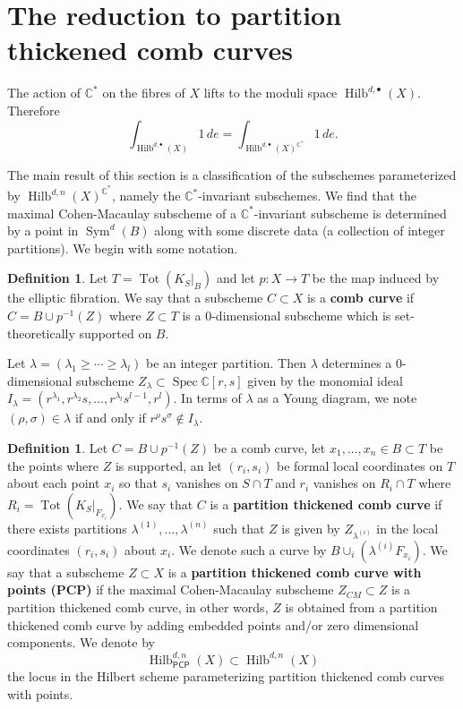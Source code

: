 \documentclass{amsart}
\theoremstyle{definition}
\newtheorem{definition}[theorem]{Definition}
\newcommand{\CC} {\mathbb{C}}          %
\newcommand{\Sym}{\operatorname{Sym}}
\newcommand{\Hilb}{\operatorname{Hilb}}
\newcommand{\Tot}{\operatorname{Tot}}
\newcommand{\Spec}{\operatorname{Spec}}
\newcommand{\PCP}{\mathsf{PCP}}
\begin{document}
\section{The reduction to partition thickened comb curves}\label{sect:
reduction to thickened comb curves}

The action of $\CC^*$ on the fibres of $X$ lifts to the moduli space
$\Hilb^{d,\bullet}(X)$. Therefore
$$
\int_{\Hilb^{d,\bullet}(X)} 1 \, de = \int_{\Hilb^{d,\bullet}(X)^{\CC^*}} 1 \, de.
$$

The main result of this section is a classification of the subschemes
parameterized by $\Hilb^{d,n}(X)^{\CC^{*}}$, namely the
$\CC^{*}$-invariant subschemes.  We find that the maximal
Cohen-Macaulay subscheme of a $\CC^{*}$-invariant subscheme is
determined by a point in $\Sym^{d}(B)$ along with some discrete data
(a collection of integer partitions). We begin with some notation.




\begin{definition}\label{defn: comb curves} 
Let $T=\Tot(K_{S}|_{B})$ and let $p:X\to T$ be the map induced by the
elliptic fibration. We say that a subscheme $C\subset X$ is a
\textbf{comb curve} if $C=B\cup p^{-1}(Z) $ where $Z\subset T$ is a
0-dimensional subscheme which is set-theoretically supported on $B$.
\end{definition}

Let $\lambda =(\lambda_{1}\geq \dotsb \geq \lambda_{l}) $ be an
integer partition. Then $\lambda$ determines a 0-dimensional subscheme
$Z_{\lambda}\subset \Spec \CC [r,s]$ given by the monomial ideal
$I_{\lambda}=(r^{\lambda_{1}},r^{\lambda_{2}}s,\dotsc
,r^{\lambda_{l}}s^{l-1},r^{l})$. In terms of $\lambda$ as a Young
diagram, we note $(\rho ,\sigma)\in \lambda$ if and only if
$r^{\rho}s^{\sigma}\notin I_{\lambda}.$ 

\begin{definition}\label{defn: partition thickened comb curve}
Let $C=B\cup p^{-1}(Z)$ be a comb curve, let $x_{1},\dotsc ,x_{n}\in
B\subset T$ be the points where $Z$ is supported, an let
$(r_{i},s_{i})$ be formal local coordinates on $T$ about each point
$x_{i}$ so that $s_{i}$ vanishes on $S\cap T$ and $r_{i}$
vanishes on $R_{i}\cap T$ where $R_{i}=\Tot (K_{S}|_{F_{x_{i}}})$. We
say that $C$ is a \textbf{partition thickened comb curve} if there
exists partitions $\lambda^{(1)},\dotsc ,\lambda^{(n)}$ such that $Z$
is given by $Z_{\lambda^{(i)}}$ in the local coordinates
$(r_{i},s_{i})$ about $x_{i}$. We denote such a curve by
$B\cup_{i}\left(\lambda^{(i)}F_{x_{i}} \right)$. We say that a
subscheme $Z\subset X$ is a \textbf{partition thickened comb curve
with points (PCP)} if the maximal Cohen-Macaulay subscheme
$Z_{CM}\subset Z$ is a partition thickened comb curve, in other words,
$Z$ is obtained from a partition thickened comb curve by adding
embedded points and/or zero dimensional components. We denote by
\[
\Hilb^{d,n}_{\PCP}(X)\subset \Hilb^{d,n}(X)
\]
the locus in the Hilbert scheme parameterizing partition thickened
comb curves with points.
\end{definition}
\end{document}
